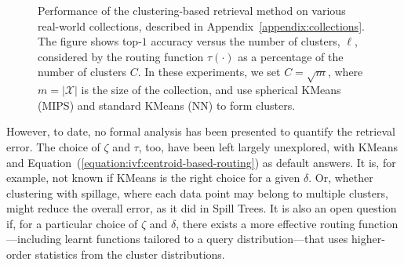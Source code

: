 \begin{figure}[t]
    \centering
    \caption{Performance of the clustering-based retrieval method on various real-world collections,
    described in Appendix~\ref{appendix:collections}.
    The figure shows top-$1$ accuracy versus the
    number of clusters, $\ell$, considered by the routing function $\tau(\cdot)$ as a percentage of
    the number of clusters $C$. In these experiments, we set $C = \sqrt{m}$, where $m=\lvert \mathcal{X} \rvert$ is the size of the collection, and use spherical KMeans (MIPS) and standard KMeans (NN)
    to form clusters.}
    \label{figure:ivf:clustering-performance}
\end{figure}

However, to date, no formal analysis has been presented to quantify the retrieval error.
The choice of $\zeta$ and $\tau$, too, have been left largely unexplored, with KMeans and
Equation~(\ref{equation:ivf:centroid-based-routing}) as default answers. It is, for example, not known
if KMeans is the right choice for a given $\delta$. Or, whether clustering with
spillage, where each data point may belong to multiple clusters, might reduce the overall
error, as it did in Spill Trees. It is also an open question if,
for a particular choice of $\zeta$ and $\delta$, there exists
a more effective routing function---including learnt functions tailored to
a query distribution---that uses higher-order statistics from the cluster distributions.

